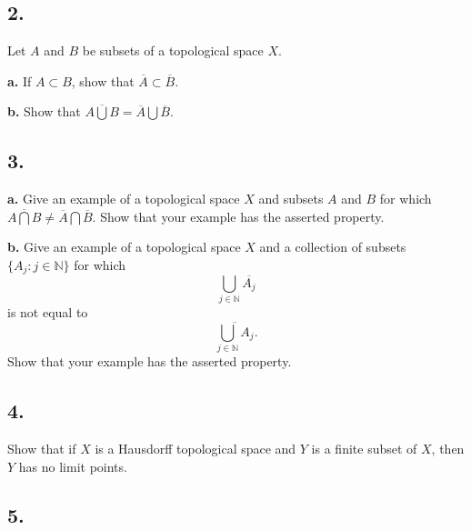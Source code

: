 \documentclass{amsart}
\theoremstyle{plain}
\theoremstyle{definition}
\theoremstyle{remark}
\begin{document}
\vspace{.15in}

\noindent
\subsection*{2.} Let $A$ and $B$ be subsets of a topological space $X$. 

\vspace{.1in}
{\bfseries a.} If $A\subset B$, show that $\overline{A} \subset \overline{B}$. 

\vspace{.1in}
{\bfseries b.} Show that $\overline{A\bigcup B} = \overline{A} \bigcup \overline{B}$. 



\vspace{.15in}

\noindent
\subsection*{3.} 

\vspace{.1in}
{\bfseries a.} Give an example of a topological space $X$ and subsets $A$ and $B$ for which $\overline{A\bigcap B} \ne \overline{A} \bigcap \overline{B}$. Show that your example has the asserted property. 

\vspace{.1in}
{\bfseries b.} Give an example of a topological space $X$ and a collection of subsets $\{ A_j : j\in \mathbb N \}$ for which 
\[
\bigcup _{j\in \mathbb N } \overline{A_j}
\]
is not equal to 
\[
\overline{\bigcup _{j\in \mathbb N } A_j}.
\]
Show that your example has the asserted property. 

\vspace{.15in}

\noindent
\subsection*{4.}  Show that if $X$ is a Hausdorff topological space and $Y$ is a finite subset of $X$, then $Y$ has no limit points.





\vspace{.15in}

\noindent
\subsection*{5.} 
\end{document}
